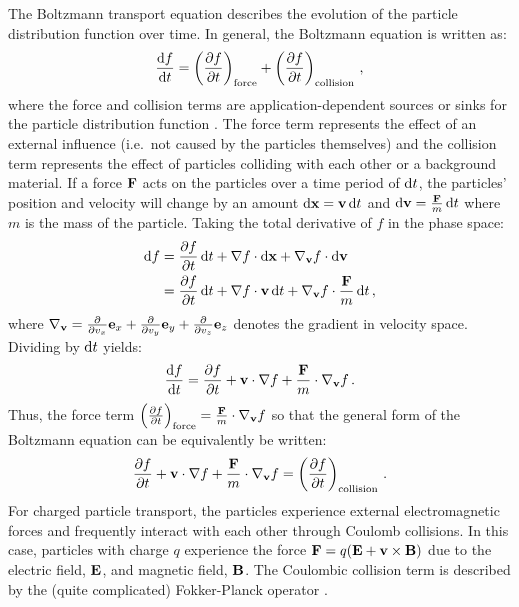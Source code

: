 \documentclass[../doc.tex]{subfiles}
\begin{document}
The Boltzmann transport equation describes the evolution of the particle distribution function over time. In general, the Boltzmann equation is written as:
	\begin{equation}
		\frac{\mathop{}\!\mathrm{d} f}{\mathop{}\!\mathrm{d} t} = \left( \frac{\partial f}{\partial t} \right)_\text{force} + \left( \frac{\partial f}{\partial t} \right)_\text{collision} \,,
	\end{equation}
where the force and collision terms are application-dependent sources or sinks for the particle distribution function \cite[Chapter 7]{chen2012introduction}. The force term represents the effect of an external influence (i.e.~not caused by the particles themselves) and the collision term represents the effect of particles colliding with each other or a background material. If a force $\boldsymbol{\mathrm{F}}$ acts on the particles over a time period of $\mathop{}\!\mathrm{d} t$, the particles' position and velocity will change by an amount $\mathop{}\!\mathrm{d} \boldsymbol{\mathrm{x}} = \boldsymbol{\mathrm{v}}\mathop{}\!\mathrm{d} t$ and $\mathop{}\!\mathrm{d} \boldsymbol{\mathrm{v}} = \frac{\boldsymbol{\mathrm{F}}}{m} \mathop{}\!\mathrm{d} t$ where $m$ is the mass of the particle. Taking the total derivative of $f$ in the phase space: 
	\begin{equation}
	\begin{aligned}
		\mathop{}\!\mathrm{d} f &= \frac{\partial f}{\partial t} \mathop{}\!\mathrm{d} t + \nabla f \cdot\mathop{}\!\mathrm{d} \boldsymbol{\mathrm{x}} + \nabla_{\boldsymbol{\mathrm{v}}} f \cdot\mathop{}\!\mathrm{d} \boldsymbol{\mathrm{v}} \\
		&= \frac{\partial f}{\partial t} \mathop{}\!\mathrm{d} t + \nabla f \cdot\boldsymbol{\mathrm{v}} \mathop{}\!\mathrm{d} t + \nabla_{\boldsymbol{\mathrm{v}}}f \cdot\frac{\boldsymbol{\mathrm{F}}}{m} \mathop{}\!\mathrm{d} t \,, 
	\end{aligned}
	\end{equation}
where $\nabla_{\boldsymbol{\mathrm{v}}} = \frac{\partial }{\partial v_x} \boldsymbol{\mathrm{e}}_x + \frac{\partial }{\partial v_y}\boldsymbol{\mathrm{e}}_y + \frac{\partial }{\partial v_z} \boldsymbol{\mathrm{e}}_z$ denotes the gradient in velocity space. 
Dividing by $\mathop{}\!\mathrm{d} t$ yields: 
	\begin{equation}
		\frac{\mathop{}\!\mathrm{d} f}{\mathop{}\!\mathrm{d} t} = \frac{\partial f}{\partial t} + \boldsymbol{\mathrm{v}} \cdot \nabla f + \frac{\boldsymbol{\mathrm{F}}}{m} \cdot \nabla_{\boldsymbol{\mathrm{v}}} f \,. 
	\end{equation}
Thus, the force term $\left( \frac{\partial f}{\partial t} \right)_\text{force} = \frac{\boldsymbol{\mathrm{F}}}{m}\cdot\nabla_{\boldsymbol{\mathrm{v}}} f$ so that the general form of the Boltzmann equation can be equivalently be written: 
	\begin{equation}
		\frac{\partial f}{\partial t} + \boldsymbol{\mathrm{v}} \cdot \nabla f + \frac{\boldsymbol{\mathrm{F}}}{m} \cdot \nabla_{\boldsymbol{\mathrm{v}}} f = \left( \frac{\partial f}{\partial t} \right)_\text{collision} \,. 
	\end{equation}
For charged particle transport, the particles experience external electromagnetic forces and frequently interact with each other through Coulomb collisions. In this case, particles with charge $q$ experience the force $\boldsymbol{\mathrm{F}} = q(\boldsymbol{\mathrm{E}} + \boldsymbol{\mathrm{v}}\times \boldsymbol{\mathrm{B}})$ due to the electric field, $\boldsymbol{\mathrm{E}}$, and magnetic field, $\boldsymbol{\mathrm{B}}$. The Coulombic collision term is described by the (quite complicated) Fokker-Planck operator \cite[Eq.~7.25]{chen2012introduction}. 
\end{document}
